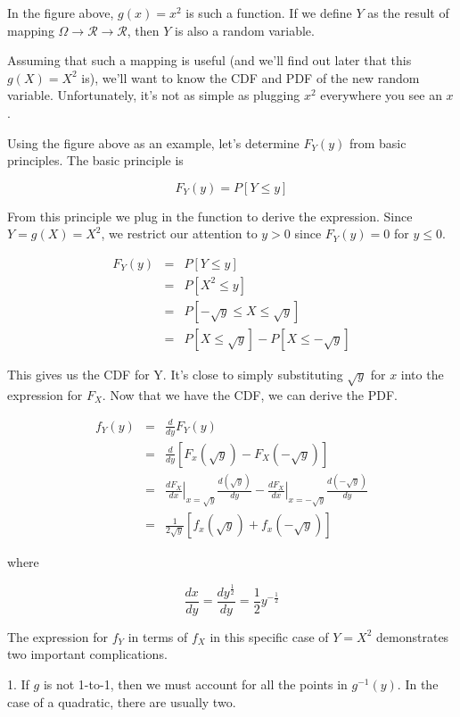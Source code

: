 \documentclass[]{article}
\begin{document}
In the figure above, $g(x) = x^2$ is such a function.  If we define
$Y$ as the result of mapping
$\Omega \rightarrow \mathcal{R} \rightarrow \mathcal{R}$, then
$Y$ is also a random variable.

Assuming that such a mapping is useful (and we'll find out later that
this $g(X) = X^2$ is), we'll want to know the CDF and PDF of the new
random variable.  Unfortunately, it's not as simple as plugging
$x^2$ everywhere you see an $x$.

Using the figure above as an example, let's determine $F_Y(y)$ from
basic principles.  The basic principle is

$$
F_Y(y) = P[Y \le y]
$$

From this principle we plug in the function to derive the expression.
Since $Y = g(X) = X^2$, we restrict our attention to $y > 0$ since
$F_Y(y) = 0$ for $y \le 0$.

\begin{eqnarray*}
F_Y(y) &= &P[Y \le y] \\
  &= &P[X^2 \le y] \\
  &= &P\left[-\sqrt{y} \le X \le \sqrt{y}\right] \\
  &= &P\left[X \le \sqrt{y}\right] - P\left[X \le -\sqrt{y}\right]
\end{eqnarray*}

This gives us the CDF for Y.  It's close to simply substituting
$\sqrt{y}$ for $x$ into the expression for $F_X$.  Now that we have
the CDF, we can derive the PDF.

\begin{eqnarray*}
f_Y(y) &= &\frac{d}{dy}F_Y(y) \\
   &= &\frac{d}{dy}\left[ F_x(\sqrt{y}) - F_X(-\sqrt{y}) \right] \\
   &= &\left. \frac{dF_X}{dx} \right\vert_{x=\sqrt{y}} \frac{d(\sqrt{y})}{dy} - 
   \left. \frac{dF_X}{dx} \right \vert_{x=-\sqrt{y}} \frac{d(-\sqrt{y})}{dy} \\
   &= &\frac{1}{2\sqrt{y}} \left[ f_x(\sqrt{y}) + f_x(-\sqrt{y}) \right]
\end{eqnarray*}

where

$$
\frac{dx}{dy} = \frac{d y^{\frac{1}{2}}}{dy} = \frac{1}{2}y^{-\frac{1}{2}}
$$

The expression for $f_Y$ in terms of $f_X$ in this specific case of
$Y = X^2$ demonstrates two important complications.

1. If $g$ is not 1-to-1, then we must account for all the points
   in $g^{-1}(y)$.  In the case of a quadratic, there are usually
   two.
\end{document}

